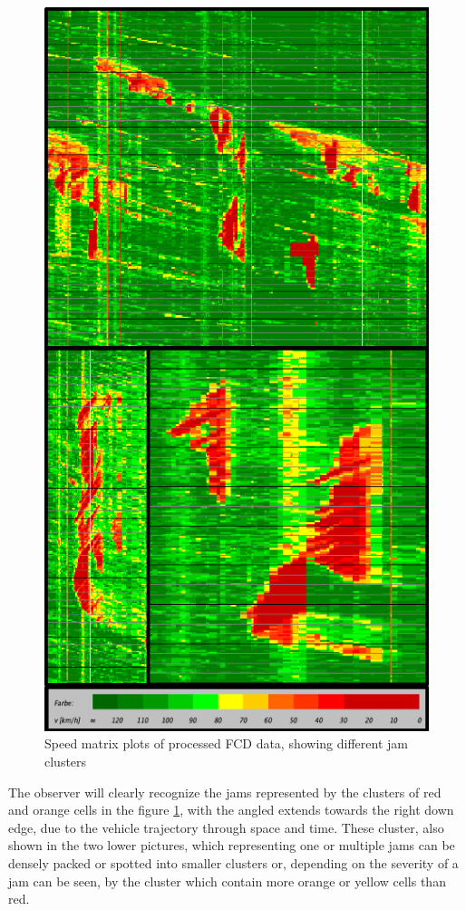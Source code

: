 \documentclass[a4paper,headsepline,footsepline,fontsize=11pt,BCOR=12mm,DIV=12]{report}
\begin{document}
\begin{figure}[h]
	\centering
	\includegraphics[scale=0.8]{./assets/SpeedMatrixPlot_mutiple}
	\caption{Speed matrix plots of processed FCD data, showing different jam clusters}
	\label{img:speedMatrixPlot_mutipleMixedClusters}
\end{figure}

The observer will clearly recognize the jams represented by the clusters of red and orange cells in the figure \ref{img:speedMatrixPlot_mutipleMixedClusters}, with the angled extends towards the right down edge, due to the vehicle trajectory through space and time. These cluster, also shown in the two lower pictures, which representing one or multiple jams can be densely packed or spotted into smaller clusters or, depending on the severity of a jam can be seen, by the cluster which contain more orange or yellow cells than red. 
\end{document}
